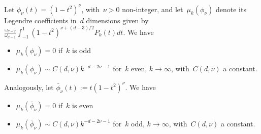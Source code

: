 \begin{lemma}
\label{lemma:phi_nu}
Let $\phi_\nu(t) = (1 - t^2)^\nu$, with~$\nu > 0$ non-integer, and let~$\mu_k(\phi_\nu)$ denote its Legendre coefficients in~$d$ dimensions given by~$\frac{\omega_{d-2}}{\omega_{d-1}}\int_{-1}^1 (1 - t^2)^{\nu + (d-3)/2} P_k(t) dt$.
We have
\begin{itemize}
	\item $\mu_k(\phi_\nu) = 0$ if~$k$ is odd
	\item $\mu_k(\phi_\nu) \sim C(d,\nu) k^{-d-2 \nu - 1}$ for~$k$ even, $k \to \infty$, with~$C(d,\nu)$ a constant.
\end{itemize}
Analogously, let $\bar \phi_\nu(t) := t(1 - t^2)^{\nu}$. We have
\begin{itemize}
	\item $\mu_k(\bar \phi_\nu) = 0$ if~$k$ is even
	\item $\mu_k(\bar \phi_\nu) \sim C(d,\nu) k^{-d-2 \nu - 1}$ for~$k$ odd, $k \to \infty$, with~$C(d,\nu)$ a constant.
\end{itemize}

\end{lemma}
